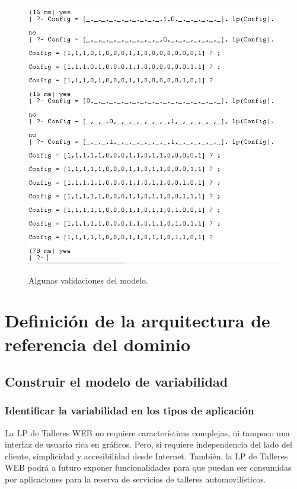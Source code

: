 \documentclass[10pt,a4paper,openany]{book}
\begin{document}
\begin{figure}[h]
	\centering
	\caption{Algunas validaciones del modelo.}
	\includegraphics[width=1\textwidth]{gnu2}
	\label{fig:gnu2}
\end{figure}



\chapter{Definición de la arquitectura de referencia del dominio}

\section{Construir el modelo de variabilidad}
\subsection{Identificar la variabilidad en los tipos de aplicación}
La LP de Talleres WEB no requiere características complejas, ni tampoco una interfaz de usuario rica en gráficos. Pero, si requiere independencia del lado del cliente, simplicidad y accesibilidad desde Internet. También, la LP de Talleres WEB podrá a futuro exponer funcionalidades para que puedan ser consumidas por aplicaciones para la reserva de servicios de talleres automovilísticos.\\
\end{document}
